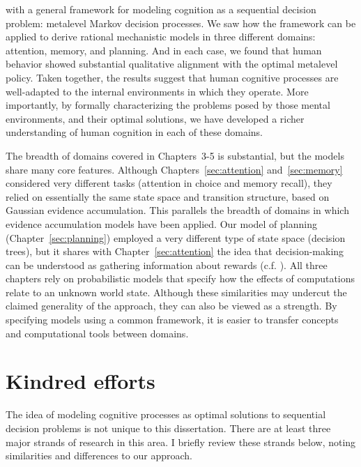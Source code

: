 \label{conclusion}

 with a general framework for modeling cognition as a sequential decision problem: metalevel Markov decision processes. We saw how the framework can be applied to derive rational mechanistic models in three different domains: attention, memory, and planning. And in each case, we found that human behavior showed substantial qualitative alignment with the optimal metalevel policy. Taken together, the results suggest that human cognitive processes are well-adapted to the internal environments in which they operate. More importantly, by formally characterizing the problems posed by those mental environments, and their optimal solutions, we have developed a richer understanding of human cognition in each of these domains.

The breadth of domains covered in Chapters~3-5 is substantial, but the models share many core features. Although Chapters~\ref{sec:attention} and~\ref{sec:memory} considered very different tasks (attention in choice and memory recall), they relied on essentially the same state space and transition structure, based on Gaussian evidence accumulation. This parallels the breadth of domains in which evidence accumulation models have been applied. Our model of planning (Chapter~\ref{sec:planning}) employed a very different type of state space (decision trees), but it shares with Chapter~\ref{sec:attention} the idea that decision-making can be understood as gathering information about rewards (c.f. \citealp{tajima2016optimal,sezener2019optimizing}). All three chapters rely on probabilistic models that specify how the effects of computations relate to an unknown world state. Although these similarities may undercut the claimed generality of the approach, they can also be viewed as a strength. By specifying models using a common framework, it is easier to transfer concepts and computational tools between domains.

\section{Kindred efforts}\label{sec:kindred}

The idea of modeling cognitive processes as optimal solutions to sequential decision problems is not unique to this dissertation. There are at least three major strands of research in this area. I briefly review these strands below, noting similarities and differences to our approach.

